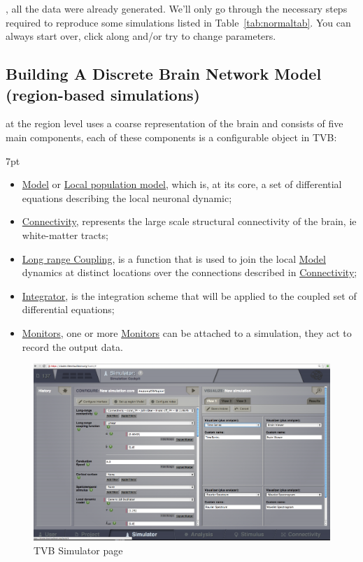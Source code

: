 \documentclass{tufte-handout}
\newenvironment{blah}{%
  \def\FrameCommand{%
    \hspace{1pt}%
    {\color{DarkOrange}\vrule width 2pt}%
    {\color{PeachPuff}\vrule width 4pt}%
    \colorbox{PeachPuff}%
  }%
  \MakeFramed{\advance\hsize-\width\FrameRestore}%
  \noindent\hspace{-4.55pt}%
  \begin{adjustwidth}{}{7pt}%
  \vspace{2pt}\vspace{2pt}%
}
{%
  \vspace{2pt}\end{adjustwidth}\endMakeFramed%
}
\begin{document}
, all the data were already generated. We'll only go through the necessary steps required to reproduce some simulations listed in Table~\ref{tab:normaltab}. You can always start over, click along and/or try to change parameters.


\subsection{Building A Discrete Brain Network Model (region-based simulations)}\label{sec:region_simulations}

 at the region level uses a coarse representation of the brain and consists of
five main components, each of these components is a configurable object in
TVB:

\begin{blah}
\begin{itemize}
\item \underline{Model} or \underline{Local population model}, which is, at its core, a set of differential equations describing the local neuronal dynamic;
\item \underline{Connectivity}, represents the large scale structural connectivity of the brain, ie white-matter tracts;
\item \underline{Long range Coupling}, is a function that is used to join the local \underline{Model} dynamics at distinct locations over the connections described in \underline{Connectivity};
\item \underline{Integrator}, is the integration scheme that will be applied to the coupled set of differential equations;
\item \underline{Monitors}, one or more \underline{Monitors} can be attached to a simulation, they act to record the output data.
\end{itemize}
\end{blah}

\begin{figure}[h]
  \includegraphics[width=\linewidth]{Handout_UI_BuildingYourOwnBrainNetworkModel_SimulatorArea}%
  \caption{TVB Simulator page}%
  \label{fig:fig}%
\end{figure}
\end{document}
